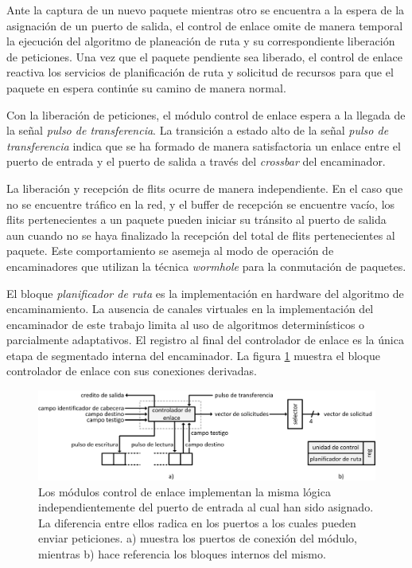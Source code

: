 Ante la captura de un nuevo paquete mientras otro se encuentra a la espera de la asignación de un puerto de salida, el control de enlace omite de manera temporal la ejecución del algoritmo de planeación de ruta y su correspondiente liberación de peticiones. Una vez que el paquete pendiente sea liberado, el control de enlace reactiva los servicios de planificación de ruta y solicitud de recursos para que el paquete en espera continúe su camino de manera normal.

Con la liberación de peticiones, el módulo control de enlace espera a la llegada de la señal \textit{pulso de transferencia}. La transición a estado alto de la señal \textit{pulso de transferencia} indica que se ha formado de manera satisfactoria un enlace entre el puerto de entrada y el puerto de salida a través del \textit{crossbar} del encaminador. 

La liberación y recepción de flits ocurre de manera independiente. En el caso que no se encuentre tráfico en la red, y el buffer de recepción se encuentre vacío, los flits pertenecientes a un paquete pueden iniciar su tránsito al puerto de salida aun cuando no se haya finalizado la recepción del total de flits pertenecientes al paquete. Este comportamiento se asemeja al modo de operación de encaminadores que utilizan la técnica \textit{wormhole} para la conmutación de paquetes.

El bloque \textit{planificador de ruta} es la implementación en hardware del algoritmo de encaminamiento. La ausencia de canales virtuales en la implementación del encaminador de este trabajo limita al uso de algoritmos determinísticos o parcialmente adaptativos. El registro al final del controlador de enlace es la única etapa de segmentado interna del encaminador. La figura \ref{fig:ch4_control_de_enlace_top} muestra el bloque controlador de enlace con sus conexiones derivadas.

\begin{figure}
	\includegraphics[width=\linewidth]{figures/ch4_control_de_enlace_top.png}
	\caption
		{	
			Los módulos control de enlace implementan la misma lógica independientemente del puerto de entrada al cual han sido asignado. La diferencia entre ellos radica en los puertos a los cuales pueden enviar peticiones. a) muestra los puertos de conexión del módulo, mientras b) hace referencia los bloques internos del mismo. 
		}
	\label{fig:ch4_control_de_enlace_top}
\end{figure}

